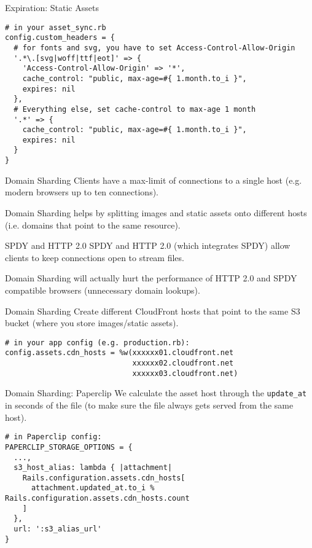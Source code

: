 \documentclass{beamer}
\begin{document}
\begin{frame}[fragile]{Expiration: Static Assets}
\begin{lstlisting}
# in your asset_sync.rb
config.custom_headers = {
  # for fonts and svg, you have to set Access-Control-Allow-Origin
  '.*\.[svg|woff|ttf|eot]' => {
    'Access-Control-Allow-Origin' => '*',
    cache_control: "public, max-age=#{ 1.month.to_i }",
    expires: nil
  },
  # Everything else, set cache-control to max-age 1 month
  '.*' => {
    cache_control: "public, max-age=#{ 1.month.to_i }",
    expires: nil
  }
}
\end{lstlisting}
\end{frame}

\begin{frame}{Domain Sharding}
Clients have a max-limit of connections to a single host (e.g. modern browsers up to ten connections).

Domain Sharding helps by splitting images and static assets onto different hosts (i.e. domains that point to the same resource).
\begin{block}{SPDY and HTTP 2.0}
SPDY and HTTP 2.0 (which integrates SPDY) allow clients to keep connections open to stream files.

Domain Sharding will actually hurt the performance of HTTP 2.0 and SPDY compatible browsers (unnecessary domain lookups).
\end{block}
\end{frame}

\begin{frame}[fragile]{Domain Sharding}
Create different CloudFront hosts that point to the same S3 bucket (where you store images/static assets).
\begin{lstlisting}
# in your app config (e.g. production.rb):
config.assets.cdn_hosts = %w(xxxxxx01.cloudfront.net
                             xxxxxx02.cloudfront.net
                             xxxxxx03.cloudfront.net)
\end{lstlisting}
\end{frame}

\begin{frame}[fragile]{Domain Sharding: Paperclip}
We calculate the asset host through the \lstinline{update_at} in seconds of the file (to make sure the file always gets served from the same host).
\begin{lstlisting}
# in Paperclip config:
PAPERCLIP_STORAGE_OPTIONS = {
  ...,
  s3_host_alias: lambda { |attachment|
    Rails.configuration.assets.cdn_hosts[
      attachment.updated_at.to_i % Rails.configuration.assets.cdn_hosts.count
    ]
  },
  url: ':s3_alias_url'
}
\end{lstlisting}
\end{frame}
\end{document}
